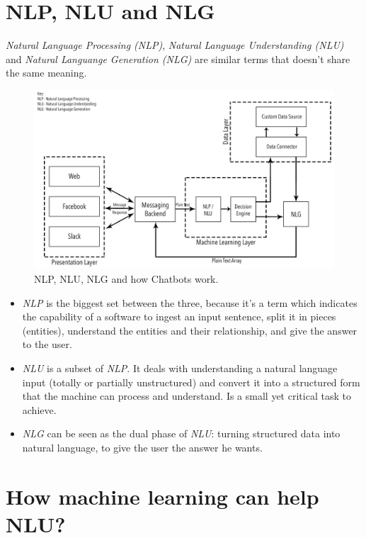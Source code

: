 \documentclass[a4paper,12pt]{report}
\begin{document}
	\section{NLP, NLU and NLG}
	\textit{Natural Language Processing (NLP)}, \textit{Natural Language Understanding (NLU)} and \textit{Natural Languange Generation (NLG)} are similar terms that doesn't share the same meaning. 
	\begin{figure}[H]
		\centering
		\includegraphics[scale=0.2]{nlschema}
		\caption{NLP, NLU, NLG and how Chatbots work.\cite{nlpnlunlg}}
	\end{figure}
	\begin{itemize}
	\item \textit{NLP} is the biggest set between the three, because it's a term which indicates the capability of a software to ingest an input sentence, split it in pieces (entities), understand the entities and their relationship, and give the answer to the user.
	
	\item \textit{NLU} is a subset of \textit{NLP}. It deals with understanding a natural language input (totally or partially unstructured) and convert it into a structured form that the machine can process and understand. Is a small yet critical task to achieve.
	
	\item \textit{NLG} can be seen as the dual phase of \textit{NLU}: turning structured data into natural language, to give the user the answer he wants.
	\end{itemize}
	
	\section{How machine learning can help NLU?}
\end{document}
